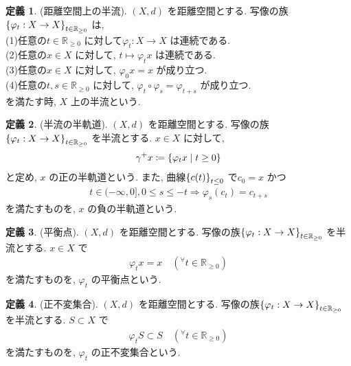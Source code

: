 \documentclass[10pt, fleqn, label-section=none]{bxjsarticle}
\theoremstyle{definition}
\newtheorem{dfn}{定義}[section]
\newcommand{\any}{{}^{\forall}}
\newcommand{\cbra}[1]{\mleft\{#1\mright\}}
\newcommand{\naraba}{\Rightarrow}
\renewcommand{\;}{\, ; \,}
\begin{document}
\begin{dfn}(距離空間上の半流). $(X, d)$ を距離空間とする. 写像の族$\cbra{\varphi_t : X \rightarrow X}_{t \in \mathbb R_{\geq 0 }   }$ は, \\
(1)任意の$t \in \mathbb R_{\geq 0 }$ に対して$\varphi_t : X \rightarrow X$ は連続である. \\
(2)任意の$x \in X$ に対して, $t \mapsto \varphi_t x$ は連続である. \\
(3)任意の$x \in X$ に対して, $\varphi_0 x = x$ が成り立つ. \\
(4)任意の$t, s \in \mathbb R_{\geq 0 }$ に対して, $\varphi_t \circ \varphi_s = \varphi_{t +s}$ が成り立つ. \\
を満たす時, $X$ 上の半流という. 

\end{dfn}

\begin{dfn}(半流の半軌道). $(X, d)$ を距離空間とする. 写像の族$\cbra{\varphi_t : X \rightarrow X}_{t \in \mathbb R_{\geq 0 } }$ を半流とする. $x \in X$ に対して, 
\begin{align*} \gamma^+ x \coloneqq \cbra{\varphi_t x \mid t \geq 0 } \end{align*}
と定め, $x$ の正の半軌道という. また, 曲線$\cbra{c(t)}_{t \leq 0}$ で$c_0 = x$ かつ
\begin{align*} t \in (- \infty, 0], 0 \leq s \leq -t \naraba \varphi_s (c_t) = c_{t + s} \end{align*}
を満たすものを, $x$ の負の半軌道という. 

\end{dfn}


\begin{dfn}(平衡点). $(X, d)$ を距離空間とする. 写像の族$\cbra{\varphi_t : X \rightarrow X}_{t \in \mathbb R_{\geq 0 } }$ を半流とする. $x \in X$ で
\begin{align*} \varphi_t x = x \quad (\any t \in \mathbb R_{\geq 0}) \end{align*}
を満たすものを, $\varphi_t$ の平衡点という. 

\end{dfn}

\begin{dfn}(正不変集合). $(X, d)$ を距離空間とする. 写像の族$\cbra{\varphi_t : X \rightarrow X}_{t \in \mathbb R_{\geq 0 } }$ を半流とする. $S \subset  X$ で
\begin{align*} \varphi_t S \subset  S \quad (\any t \in \mathbb R_{\geq 0}) \end{align*}
を満たすものを, $\varphi_t$ の正不変集合という. 

\end{dfn}
\end{document}
